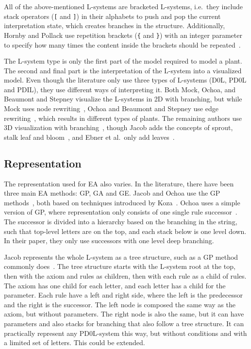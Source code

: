 All of the above-mentioned \glspl{L-system} are bracketed \glspl{L-system}, i.e.\ they include stack operators (\texttt{[} and \texttt{]}) in their alphabets to push and pop the current interpretation state, which creates branches in the structure.
Additionally, Hornby and Pollack use repetition brackets (\texttt{\{} and \texttt{\}}) with an integer parameter to specify how many times the content inside the brackets should be repeated~\cite{2001Hornby}.

The \gls{L-system} type is only the first part of the model required to model a plant.
The second and final part is the interpretation of the \gls{L-system} into a visualized model.
Even though the literature only use three types of \glspl{L-system} (D0L, PD0L and PDIL), they use different ways of interpreting it.
Both Mock, Ochoa, and Beaumont and Stepney visualize the \glspl{L-system} in 2D with branching, but while Mock uses node rewriting~\cite{1998Mock}, Ochoa and Beaumont and Stepney use edge rewriting~\cite{1998Ochoa,2009Beaumont}, which results in different types of plants.
The remaining authors use 3D visualization with branching~\cite{1994Jacob,2006Ashlock}, though Jacob adds the concepts of sprout, stalk leaf and bloom~\cite{1995Jacob}, and Ebner et al.\ only add leaves~\cite{2002Ebner,2003Ebner}.

\subsection{Representation}
The representation used for \gls{EA} also varies.
In the literature, there have been three main \gls{EA} methods: \gls{GP}, \gls{GA} and \gls{GE}.
Jacob and Ochoa use the \gls{GP} methods~\cite{1994Jacob,1995Jacob,1998Ochoa}, both based on techniques introduced by Koza~\cite{1992Koza}.
Ochoa uses a simple version of \gls{GP}, where representation only consists of one single rule successor~\cite{1998Ochoa}.
The successor is divided into a hierarchy based on the branching in the string, such that top-level letters are on the top, and each stack below is one level down.
In their paper, they only use successors with one level deep branching.

Jacob represents the whole \gls{L-system} as a tree structure, such as a \gls{GP} method commonly does~\cite{1994Jacob}.
The tree structure starts with the \gls{L-system} root at the top, then with the axiom and rules as children, then with each rule as a child of rules.
The axiom has one child for each letter, and each letter has a child for the parameter.
Each rule have a left and right side, where the left is the predecessor and the right is the successor.
The left node is composed the same way as the axiom, but without parameters.
The right node is also the same, but it can have parameters and also stacks for branching that also follow a tree structure.
It can practically represent any PD0L-system this way, but without conditions and with a limited set of letters.
This could be extended.

